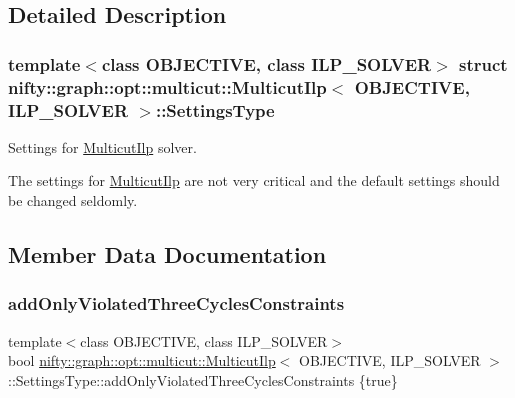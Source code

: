 \subsection{Detailed Description}
\subsubsection*{template$<$class O\+B\+J\+E\+C\+T\+I\+VE, class I\+L\+P\+\_\+\+S\+O\+L\+V\+ER$>$\newline
struct nifty\+::graph\+::opt\+::multicut\+::\+Multicut\+Ilp$<$ O\+B\+J\+E\+C\+T\+I\+V\+E, I\+L\+P\+\_\+\+S\+O\+L\+V\+E\+R $>$\+::\+Settings\+Type}

Settings for \hyperlink{classnifty_1_1graph_1_1opt_1_1multicut_1_1MulticutIlp}{Multicut\+Ilp} solver. 

The settings for \hyperlink{classnifty_1_1graph_1_1opt_1_1multicut_1_1MulticutIlp}{Multicut\+Ilp} are not very critical and the default settings should be changed seldomly. 

\subsection{Member Data Documentation}
\mbox{\label{structnifty_1_1graph_1_1opt_1_1multicut_1_1MulticutIlp_1_1SettingsType_ad759353f0698ef7051d150f8a7d3d933}} 
\subsubsection{\texorpdfstring{add\+Only\+Violated\+Three\+Cycles\+Constraints}{addOnlyViolatedThreeCyclesConstraints}}
{\footnotesize\ttfamily template$<$class O\+B\+J\+E\+C\+T\+I\+VE, class I\+L\+P\+\_\+\+S\+O\+L\+V\+ER$>$ \\
bool \hyperlink{classnifty_1_1graph_1_1opt_1_1multicut_1_1MulticutIlp}{nifty\+::graph\+::opt\+::multicut\+::\+Multicut\+Ilp}$<$ O\+B\+J\+E\+C\+T\+I\+VE, I\+L\+P\+\_\+\+S\+O\+L\+V\+ER $>$\+::Settings\+Type\+::add\+Only\+Violated\+Three\+Cycles\+Constraints \{true\}}



